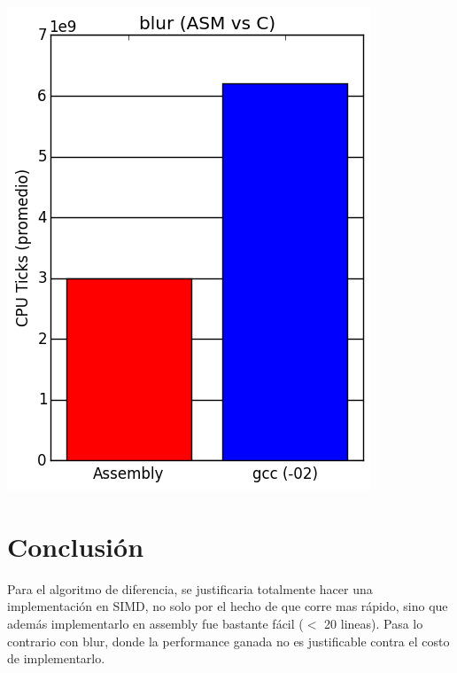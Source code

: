\documentclass[a4paper]{article}
\begin{document}
\begin{center}
    \includegraphics[scale=0.6]{imagenes/test_blur_ASM_C.png}
\end{center}

\section{Conclusión}

\noindent Para el algoritmo de diferencia, se justificaria totalmente hacer una implementación en SIMD, no solo por el hecho de que corre mas rápido, sino que además implementarlo en assembly fue bastante fácil ($<$ 20 lineas). Pasa lo contrario con blur, donde la performance ganada no es justificable contra el costo de implementarlo.
\end{document}
